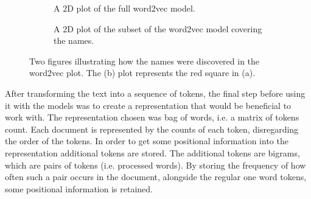 \begin{figure}
    \begin{subfigure}[b]{\textwidth}
        \centering
        \caption{A 2D plot of the full word2vec model.}
    \end{subfigure}
    \quad
    \begin{subfigure}[b]{\textwidth}
        \centering
        \caption{A 2D plot of the subset of the word2vec model covering the names.}
    \end{subfigure}
    \caption{Two figures illustrating how the names were discovered in the word2vec plot. The (b) plot represents the red square in (a).}
    \label{fig:word2vec-names-overview}
\end{figure}


After transforming the text into a sequence of tokens, the final step before using it with the models was to create a representation that would be beneficial to work with.
The representation chosen was bag of words, i.e. a matrix of tokens count.
Each document is represented by the counts of each token, disregarding the order of the tokens.
In order to get some positional information into the representation additional tokens are stored. 
The additional tokens are bigrams, which are pairs of tokens (i.e. processed words).
By storing the frequency of how often such a pair occurs in the document, alongside the regular one word tokens, some positional information is retained.

